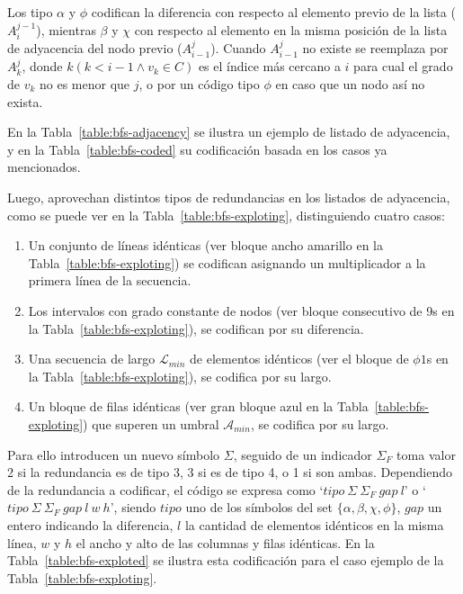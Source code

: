Los tipo $\alpha$ y $\phi$ codifican la diferencia con respecto al elemento previo de la lista ($A_{i}^{j - 1}$), mientras $\beta$ y $\chi$ con respecto al elemento en la misma posición de la lista de adyacencia del nodo previo ($A_{i - 1}^{j}$). Cuando $A_{i - 1}^{j}$ no existe se reemplaza por $A_{k}^{j}$, donde $k (k < i - 1 \wedge v_{k} \in C)$ es el índice más cercano a $i$ para cual el grado de $v_{k}$ no es menor que $j$, o por un código tipo $\phi$ en caso que un nodo así no exista.

En la Tabla~\ref{table:bfs-adjacency} se ilustra un ejemplo de listado de adyacencia, y en la Tabla~\ref{table:bfs-coded} su codificación basada en los casos ya mencionados.





Luego, aprovechan distintos tipos de redundancias en los listados de adyacencia, como se puede ver en la Tabla~\ref{table:bfs-exploting}, distinguiendo cuatro casos:

\begin{enumerate}
	\item Un conjunto de líneas idénticas (ver bloque ancho amarillo en la Tabla~\ref{table:bfs-exploting}) se codifican asignando un multiplicador a la primera línea de la secuencia.
	\item Los intervalos con grado constante de nodos (ver bloque consecutivo de 9s en la Tabla~\ref{table:bfs-exploting}), se codifican por su diferencia.
	\item Una secuencia de largo $\mathcal{L}_{min}$ de elementos idénticos (ver el bloque de $\phi1$s en la Tabla~\ref{table:bfs-exploting}), se codifica por su largo.
	\item Un bloque de filas idénticas (ver gran bloque azul en la Tabla~\ref{table:bfs-exploting}) que superen un umbral $\mathcal{A}_{min}$, se codifica por su largo.
\end{enumerate}



Para ello introducen un nuevo símbolo $\Sigma$, seguido de un indicador $\Sigma_{F}$ toma valor 2 si la redundancia es de tipo 3, 3 si es de tipo 4, o 1 si son ambas. Dependiendo de la redundancia a codificar, el código se expresa como `$tipo\:\Sigma\:\Sigma_{F}\:gap\:l$'  o `$tipo\:\Sigma\:\Sigma_{F}\:gap\:l\:w\:h$', siendo $tipo$ uno de los símbolos del set $\{\alpha, \beta, \chi, \phi\}$, $gap$ un entero indicando la diferencia, $l$ la cantidad de elementos idénticos en la misma línea, $w$ y $h$ el ancho y alto de las columnas y filas idénticas. En la Tabla~\ref{table:bfs-exploted} se ilustra esta codificación para el caso ejemplo de la Tabla~\ref{table:bfs-exploting}.

